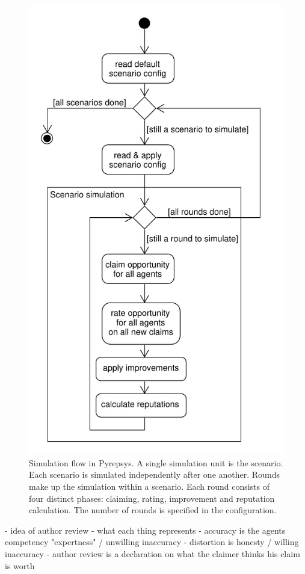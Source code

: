 \documentclass[%
    ]{\PathToTumTemplate/thesis/tum_thesis}
\begin{document}
\begin{figure}[tbp]
  \begin{center}
        \includegraphics[width=0.75\linewidth]	{../uml/simulation_flow.pdf}
    \caption{
    Simulation flow in Pyrepsys.
    A single simulation unit is the \gls{scenario}.
    Each \gls{scenario} is simulated independently after one another.
    Rounds make up the simulation within a \gls{scenario}.
    Each round consists of four distinct phases: claiming, rating, improvement and reputation calculation.
    The number of rounds is specified in the configuration.
    }
    \label{fig:simulation_flow}
  \end{center}
\end{figure}






- idea of author review
- what each thing represents
  - accuracy is the agents competency "expertness" / unwilling inaccuracy
  - distortion is honesty / willing inaccuracy
  - author review is a declaration on what the claimer thinks his claim is worth
\end{document}
